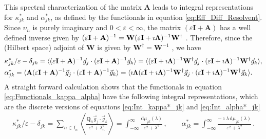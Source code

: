 \documentclass[11pt]{amsart}
\renewcommand{\d}{\mathrm{d}}
\newcommand{\Ib}{\mathbf{I}}
\newcommand{\Ab}{\mathbf{A}}
\newcommand{\Qb}{\mathbf{Q}}
\newcommand{\Wb}{\mathbf{W}}
\newcommand\bLambda{\mbox{\boldmath${\Lambda}$}}
\begin{document}
This spectral characterization of the matrix $\Ab$ leads to integral
representations for $\kappa_{jk}^*$ and $\alpha_{jk}^*$, as defined by the
functionals in equation \eqref{eq:Eff_Diff_Resolvent}. Since $\upsilon_n$ is
purely imaginary and $0<\varepsilon<\infty$, the matrix $(\varepsilon\Ib+\Ab)$ has a well defined
inverse given by
$(\varepsilon\Ib+\Ab)^{-1}=\Wb(\varepsilon\Ib+\imath\bLambda)^{-1}\Wb^\dagger$
\cite{Horn_Johnson-1990}. Therefore, since the (Hilbert space) adjoint
of $\Wb$ is given by $\Wb^\dagger=\Wb^{-1}$
\cite{Horn_Johnson-1990,Keener-2000}, we have  
% 
\begin{align}\label{eq:Functionals_kappa_alpha}
  &\kappa^*_{jk}/\varepsilon-\delta_{jk}=\langle(\varepsilon\Ib+\Ab)^{-1}\vec{g}_j\cdot(\varepsilon\Ib+\Ab)^{-1}\vec{g}_k\rangle 
=\langle(\varepsilon\Ib+\imath\bLambda)^{-1}\Wb^\dagger\vec{g}_j\cdot(\varepsilon\Ib+\imath\bLambda)^{-1}\Wb^\dagger\vec{g}_k\rangle ,
\\
&\alpha^*_{jk}=\langle\Ab(\varepsilon\Ib+\Ab)^{-1}\vec{g}_j\cdot(\varepsilon\Ib+\Ab)^{-1}\vec{g}_k\rangle
=\langle\imath\bLambda(\varepsilon\Ib+\imath\bLambda)^{-1}\Wb^\dagger\vec{g}_j\cdot(\varepsilon\Ib+\imath\bLambda)^{-1}\Wb^\dagger\vec{g}_k\rangle. 
\notag
\end{align}
%
A straight forward calculation shows that the functionals in equation
\eqref{eq:Functionals_kappa_alpha} have the following integral
representations, which are the discrete versions of equations
\eqref{eq:Int_kappa*_jk} and \eqref{eq:Int_alpha*_jk}  
%
\begin{align}\label{eq:Integral_Rep_Discrete}
  \kappa^*_{jk}/\varepsilon-\delta_{jk}
 =\sum_{n\in I_n} 
 \left\langle\frac{\Qb_n\vec{g}_j\cdot\vec{g}_k}{\varepsilon^2+\lambda_n^2}\right\rangle
 =\int_{-\infty}^\infty\frac{\d\mu_{jk}(\lambda)}{\varepsilon^2+\lambda^2}\,,
 \qquad 
 \alpha^*_{jk}
 =\int_{-\infty}^\infty\frac{-\imath\lambda\,\d\mu_{jk}(\lambda)}{\varepsilon^2+\lambda^2}\,.
\end{align}
\end{document}
